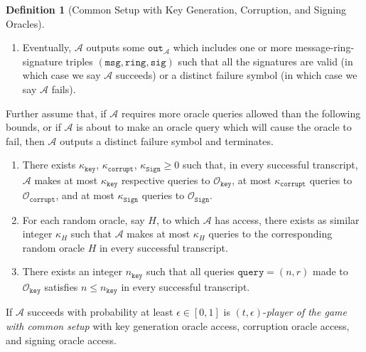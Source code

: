 \documentclass[11pt]{article}
\theoremstyle{definition}
\newtheorem{definition}[definition]{Definition}
\newcommand{\ring}{\texttt{ring}}
\newcommand{\sig}{\texttt{sig}}
\newcommand{\secpar}{\lambda}
\newcommand{\msg}{\texttt{msg}}
\newcommand{\sign}{\texttt{Sign}}
\newcommand{\polysecpar}{O(\text{poly}(\secpar))}
\newcommand{\negl}{\text{negl}(\secpar)}
\newcommand{\corruptionOracle}{\mathcal{O}_{\texttt{corrupt}}}
\newcommand{\signingOracle}{\mathcal{O}_{\sign}}
\newcommand{\keyOracle}{\mathcal{O}_{\texttt{key}}}
\begin{document}
\begin{definition}[Common Setup with Key Generation, Corruption, and Signing Oracles]
\begin{enumerate}
\begin{enumerate}
\end{enumerate}
\item Eventually, $\mathcal{A}$ outputs some $\texttt{out}_\mathcal{A}$ which includes one or more message-ring-signature triples $(\msg, \ring, \sig)$ such that all the signatures are valid (in which case we say $\mathcal{A}$ succeeds) or a distinct failure symbol (in which case we say $\mathcal{A}$ fails).
\end{enumerate}

Further assume that, if $\mathcal{A}$ requires more oracle queries allowed than the following bounds, or if $\mathcal{A}$ is about to make an oracle query which will cause the oracle to fail, then $\mathcal{A}$ outputs a distinct failure symbol and terminates.
\begin{enumerate}
\item There exists $\kappa_{\texttt{key}}$, $\kappa_{\texttt{corrupt}}$, $\kappa_{\sign} \geq 0$ such that, in every successful transcript, $\mathcal{A}$ makes at most $\kappa_{\texttt{key}}$ respective queries to $\keyOracle$, at most $\kappa_{\texttt{corrupt}}$ queries to $\corruptionOracle$, and at most $\kappa_{\sign}$ queries to $\signingOracle$. 

\item For each random oracle, say $H$, to which $\mathcal{A}$ has access, there exists as similar integer $\kappa_{H}$ such that $\mathcal{A}$ makes at most $\kappa_{H}$ queries to the corresponding random oracle $H$ in every successful transcript. 

\item There exists an integer $n_{\texttt{key}}$ such that all queries $\texttt{query} = (n, r)$ made to $\keyOracle$ satisfies $n \leq n_{\texttt{key}}$ in every successful transcript.

\end{enumerate}

If $\mathcal{A}$ succeeds with probability at least $\epsilon \in [0,1]$ is $(t,\epsilon)$-\textit{player of the game with common setup} with key generation oracle access, corruption oracle access, and signing oracle access. 
\end{definition}
\end{document}
